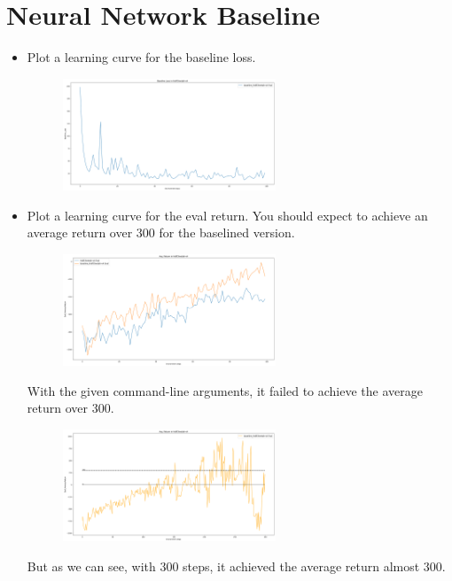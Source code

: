 \documentclass{article}
\begin{document}
\newpage\section{Neural Network Baseline}
\begin{itemize}
    \item Plot a learning curve for the baseline loss.
    \begin{figure}[H]
        \centering
        \includegraphics[width=0.6\textwidth]{hw2_baseline_loss.png}
    \end{figure}
    \item Plot a learning curve for the eval return. You should expect to achieve an average return over 300 for the baselined version.
    \begin{figure}[H]
        \centering
        \includegraphics[width=0.6\textwidth]{hw2_baseline_return.png}
    \end{figure}
    With the given command-line arguments, it failed to achieve the average return over 300. 
    \begin{figure}[H]
        \centering
        \includegraphics[width=0.6\textwidth]{hw2_baseline_loss_300.png}
    \end{figure}
    But as we can see, with 300 steps, it achieved the average return almost 300.

\end{itemize}
\end{document}
